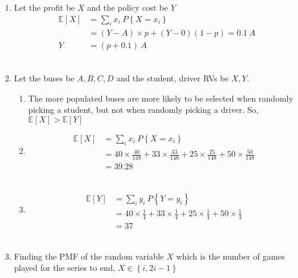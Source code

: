 \begin{enumerate}
	
	\item Let the profit be $ X $ and the policy cost be $ Y $\\
	
	
		\begin{align}
			\mathbb{E}[X] &= \sum\limits_{i} x_i\ P \left\{ X = x_i \right\} \nonumber \\
			&= (Y - A) \times p + (Y - 0)(1-p) = 0.1\ A\\
			Y &= (p + 0.1)\ A 
		\end{align} \\
	
	
	\item Let the buses be $ A, B, C, D $ and the student, driver RVs be $ X, Y $. \\
	
		\begin{enumerate}
			
			\item The more populated buses are more likely to be selected when randomly picking a student, but not when randomly picking a driver. So, $ \mathbb{E}[X] > \mathbb{E}[Y] $ \\
			
			
			\item \begin{align}
				\mathbb{E}[X] &= \sum\limits_{i} x_i\ P \left\{ X = x_i \right\} \nonumber \\
				&= 40 \times \frac{40}{148} + 33 \times \frac{33}{148} + 25 \times \frac{25}{148} + 50 \times \frac{50}{148}\\
				&= 39.28
			\end{align} \\
			
			\item \begin{align}
				\mathbb{E}[Y] &= \sum\limits_{i} y_i\ P \left\{ Y = y_i \right\} \nonumber \\
				&= 40 \times \frac{1}{4} + 33 \times \frac{1}{4} + 25 \times \frac{1}{4} + 50 \times \frac{1}{4}\\
				&= 37
			\end{align} \\
			
		\end{enumerate}
	
	
	\item Finding the PMF of the random variable $ X $ which is the number of games played for the series to end, $ X \in \left\{i, 2i-1\right\} $\\
	

\end{enumerate}
